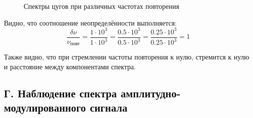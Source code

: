 \documentclass[a4paper,12pt]{article}
\begin{document}
\begin{enumerate}
\begin{figure}[h]
\begin{minipage}[h]{0.47\linewidth}
\end{minipage}
\caption{Спектры цугов при различных частотах повторения}
\label{ris:experimentalcorrelationsignals5}
\end{figure}

Видно, что соотношение неопределённости выполняется:
\[
\frac{\delta \nu}{\nu_\text{повт}} = \frac{1\cdot10^3}{1\cdot10^3} = \frac{0.5\cdot10^3}{0.5\cdot10^3} = \frac{0.25\cdot10^3}{0.25\cdot10^3} = 1
\]

Также видно, что при стремлении частоты повторения к нулю, стремится к нулю и расстояние между компонентами спектра.
\end{enumerate}

\newpage

\subsection*{Г. Наблюдение спектра амплитудно-модулированного сигнала}
\end{document}

